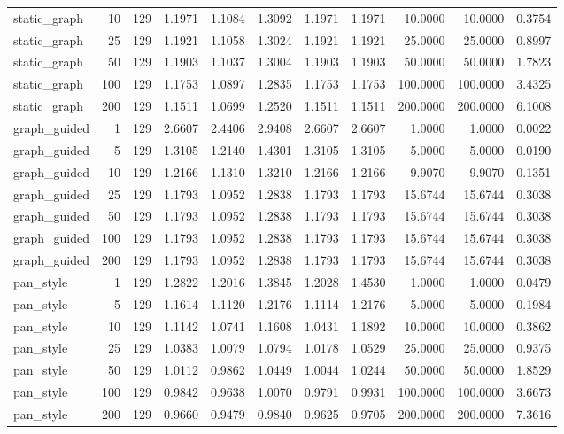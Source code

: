 \begin{table}[t]
\begin{tabular}{lrrrrrrrrrr}
static\_graph & 10 & 129 & 1.1971 & 1.1084 & 1.3092 & 1.1971 & 1.1971 & 10.0000 & 10.0000 & 0.3754 \\
static\_graph & 25 & 129 & 1.1921 & 1.1058 & 1.3024 & 1.1921 & 1.1921 & 25.0000 & 25.0000 & 0.8997 \\
static\_graph & 50 & 129 & 1.1903 & 1.1037 & 1.3004 & 1.1903 & 1.1903 & 50.0000 & 50.0000 & 1.7823 \\
static\_graph & 100 & 129 & 1.1753 & 1.0897 & 1.2835 & 1.1753 & 1.1753 & 100.0000 & 100.0000 & 3.4325 \\
static\_graph & 200 & 129 & 1.1511 & 1.0699 & 1.2520 & 1.1511 & 1.1511 & 200.0000 & 200.0000 & 6.1008 \\
graph\_guided & 1 & 129 & 2.6607 & 2.4406 & 2.9408 & 2.6607 & 2.6607 & 1.0000 & 1.0000 & 0.0022 \\
graph\_guided & 5 & 129 & 1.3105 & 1.2140 & 1.4301 & 1.3105 & 1.3105 & 5.0000 & 5.0000 & 0.0190 \\
graph\_guided & 10 & 129 & 1.2166 & 1.1310 & 1.3210 & 1.2166 & 1.2166 & 9.9070 & 9.9070 & 0.1351 \\
graph\_guided & 25 & 129 & 1.1793 & 1.0952 & 1.2838 & 1.1793 & 1.1793 & 15.6744 & 15.6744 & 0.3038 \\
graph\_guided & 50 & 129 & 1.1793 & 1.0952 & 1.2838 & 1.1793 & 1.1793 & 15.6744 & 15.6744 & 0.3038 \\
graph\_guided & 100 & 129 & 1.1793 & 1.0952 & 1.2838 & 1.1793 & 1.1793 & 15.6744 & 15.6744 & 0.3038 \\
graph\_guided & 200 & 129 & 1.1793 & 1.0952 & 1.2838 & 1.1793 & 1.1793 & 15.6744 & 15.6744 & 0.3038 \\
pan\_style & 1 & 129 & 1.2822 & 1.2016 & 1.3845 & 1.2028 & 1.4530 & 1.0000 & 1.0000 & 0.0479 \\
pan\_style & 5 & 129 & 1.1614 & 1.1120 & 1.2176 & 1.1114 & 1.2176 & 5.0000 & 5.0000 & 0.1984 \\
pan\_style & 10 & 129 & 1.1142 & 1.0741 & 1.1608 & 1.0431 & 1.1892 & 10.0000 & 10.0000 & 0.3862 \\
pan\_style & 25 & 129 & 1.0383 & 1.0079 & 1.0794 & 1.0178 & 1.0529 & 25.0000 & 25.0000 & 0.9375 \\
pan\_style & 50 & 129 & 1.0112 & 0.9862 & 1.0449 & 1.0044 & 1.0244 & 50.0000 & 50.0000 & 1.8529 \\
pan\_style & 100 & 129 & 0.9842 & 0.9638 & 1.0070 & 0.9791 & 0.9931 & 100.0000 & 100.0000 & 3.6673 \\
pan\_style & 200 & 129 & 0.9660 & 0.9479 & 0.9840 & 0.9625 & 0.9705 & 200.0000 & 200.0000 & 7.3616 \\

\end{tabular}
\end{table}
